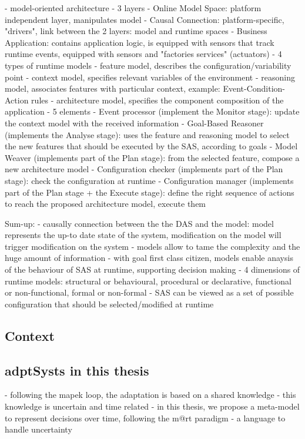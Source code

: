     - model-oriented architecture
        - 3 layers
            - Online Model Space: platform independent layer, manipulates model
            - Causal Connection: platform-specific, "drivers", link between the 2 layers: model and runtime spaces
            - Business Application: contains application logic, is equipped with sensors that track runtime events, equipped with sensors and "factories services" (actuators)
        - 4 types of runtime models
            - feature model, describes the configuration/variability point
            - context model, specifies relevant variables of the environment
            - reasoning model, associates features with particular context, example: Event-Condition-Action rules
            - architecture model, specifies the component composition of the application
        - 5 elements
            - Event processor (implement the Monitor stage): update the context model with the received information
            - Goal-Based Reasoner (implements the Analyse stage): uses the feature and reasoning model to select the new features that should be executed by the SAS, according to goals
            - Model Weaver (implements part of the Plan stage): from the selected feature, compose a new architecture model
            - Configuration checker (implements part of the Plan stage): check the configuration at runtime
            - Configuration manager (implements part of the Plan stage + the Execute stage): define the right sequence of actions to reach the proposed architecture model, execute them 

Sum-up:
    - causally connection between the the DAS and the model: model represents the up-to date state of the system, modification on the model will trigger modification on the system
    - models allow to tame the complexity and the huge amount of information
    - with goal first class citizen, models enable anaysis of the behaviour of SAS at runtime, supporting decision making
    - 4 dimensions of runtime models: structural or behavioural, procedural or declarative, functional or non-functional, formal or non-formal
    - SAS can be viewed as a set of possible configuration that should be selected/modified at runtime 

\subsection{Context}

\subsection[Adaptive systems in the context of this thesis]{\Glspl{adptSyst} in this thesis}

- following the \gls{mapek} loop, the adaptation is based on a shared knowledge
- this knowledge is uncertain and time related
- in this thesis, we propose a meta-model to represent decisions over time, following the \gls{m@rt} paradigm
- a language to handle uncertainty